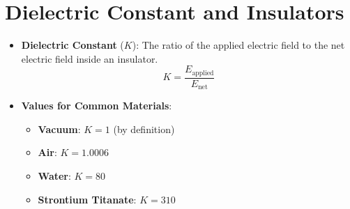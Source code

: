 \documentclass{article}
\begin{document}
\section*{Dielectric Constant and Insulators}
\begin{itemize}
    \item \textbf{Dielectric Constant} (\(K\)): The ratio of the applied electric field to the net electric field inside an insulator.
    \[
    K = \frac{E_{\text{applied}}}{E_{\text{net}}}
    \]
    \item \textbf{Values for Common Materials}:
    \begin{itemize}
        \item \textbf{Vacuum}: \(K = 1\) (by definition)
        \item \textbf{Air}: \(K = 1.0006\)
        \item \textbf{Water}: \(K = 80\)
        \item \textbf{Strontium Titanate}: \(K = 310\)
    \end{itemize}
\end{itemize}
\end{document}
